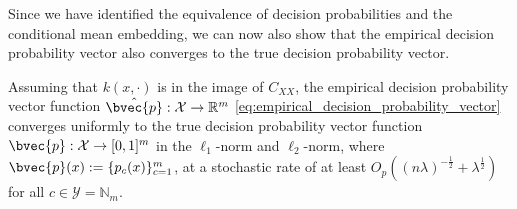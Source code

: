 \documentclass[runningheads, envcountsame, a4paper]{llncs}
\begin{document}
		Since we have identified the equivalence of decision probabilities and the conditional mean embedding, we can now also show that the empirical decision probability vector also converges to the true decision probability vector.
		
		\begin{lemma}
			\label{thm:probability_vector_convergence} 
			Assuming that $k(x, \cdot)$ is in the image of $C_{XX}$, the empirical decision probability vector function $\hat{\bvec{p}} : \mathcal{X} \to \mathbb{R}^{m}$ \eqref{eq:empirical_decision_probability_vector} converges uniformly to the true decision probability vector function $\bvec{p} : \mathcal{X} \to [0, 1]^{m}$ in the $\ell_{1}$-norm and $\ell_{2}$-norm, where $\bvec{p}(x) := \{p_{c}(x)\}_{c = 1}^{m}$, at a stochastic rate of at least $O_{p}((n \lambda)^{-\frac{1}{2}} + \lambda^{\frac{1}{2}})$ for all $c \in \mathcal{Y} = \mathbb{N}_{m}$.
		\end{lemma}
		
\end{document}

